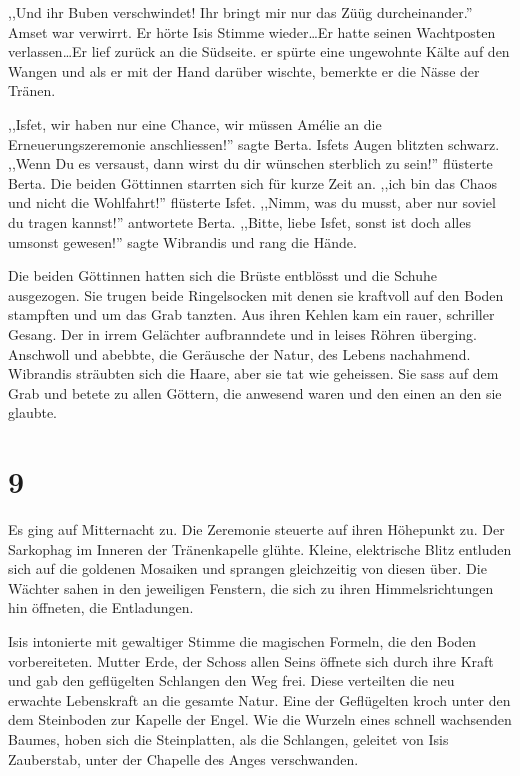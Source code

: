 \documentclass[11pt,titlepage,a5paper]{book}
\begin{document}
,,Und ihr Buben verschwindet! Ihr bringt mir nur das Züüg durcheinander.'' Amset war verwirrt. Er hörte Isis Stimme wieder\dots Er hatte seinen Wachtposten verlassen\dots Er lief zurück an die Südseite. er spürte eine ungewohnte Kälte auf den Wangen und als er mit der Hand darüber wischte, bemerkte er die Nässe der Tränen. 

,,Isfet, wir haben nur eine Chance, wir müssen Amélie an die Erneuerungszeremonie anschliessen!'' sagte Berta. Isfets Augen blitzten schwarz. ,,Wenn Du es versaust, dann wirst du dir wünschen sterblich zu sein!'' flüsterte Berta. Die beiden Göttinnen starrten sich für kurze Zeit an. ,,ich bin das Chaos und nicht die Wohlfahrt!'' flüsterte Isfet. ,,Nimm, was du musst, aber nur soviel du tragen kannst!'' antwortete Berta. ,,Bitte, liebe Isfet, sonst ist doch alles umsonst gewesen!'' sagte Wibrandis und rang die Hände.

Die beiden Göttinnen hatten sich die Brüste entblösst und die Schuhe ausgezogen. Sie trugen beide Ringelsocken mit denen sie kraftvoll auf den Boden stampften und um das Grab tanzten. Aus ihren Kehlen kam ein rauer, schriller Gesang. Der in irrem Gelächter aufbranndete und in leises Röhren überging. Anschwoll und abebbte, die Geräusche der Natur, des Lebens nachahmend. Wibrandis sträubten sich die Haare, aber sie tat wie geheissen. Sie sass auf dem Grab und betete zu allen Göttern, die anwesend waren und den einen an den sie glaubte.

\section*{9}

Es ging auf Mitternacht zu. Die Zeremonie steuerte auf ihren Höhepunkt zu. Der Sarkophag im Inneren der Tränenkapelle glühte. Kleine, elektrische Blitz entluden sich auf die goldenen Mosaiken und sprangen gleichzeitig von diesen über. Die Wächter sahen in den jeweiligen Fenstern, die sich zu ihren Himmelsrichtungen hin öffneten, die Entladungen.

Isis intonierte mit gewaltiger Stimme die magischen Formeln, die den Boden vorbereiteten. Mutter Erde, der Schoss allen Seins öffnete sich durch ihre Kraft und gab den geflügelten Schlangen den Weg frei. Diese verteilten die neu erwachte Lebenskraft an die gesamte Natur. Eine der Geflügelten kroch unter den dem Steinboden zur Kapelle der Engel. Wie die Wurzeln eines schnell wachsenden Baumes, hoben sich die Steinplatten, als die Schlangen, geleitet von Isis Zauberstab, unter der Chapelle des Anges verschwanden.
\end{document}
